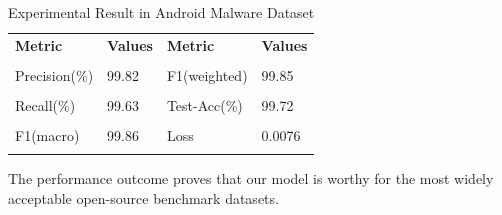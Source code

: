 \documentclass[pdflatex,sn-mathphys]{sn-jnl}%
\begin{document}
	\begin{table}[tb]
         \centering
		\caption{Experimental Result in Android Malware Dataset}
		\begin{tabular}{|p{2.6cm}||p{1.5cm}||p{2.6cm}||p{3.8cm}|}
			\midrule
			\textbf{Metric} & \textbf{Values} & \textbf{Metric} & \textbf{Values}\\\\
			  \midrule
			Precision(\%)   &  99.82 & F1(weighted)  & 99.85  \\\\
		
			Recall(\%) & 99.63 & Test-Acc(\%) & 99.72 \\\\
			
			F1(macro)  &  99.86 & Loss  & 0.0076 \\\\
			\hline
		\end{tabular}
	
		\label{student-malware}
  \vspace{-4mm}
	\end{table}

The performance outcome proves that our model is worthy for the most widely acceptable open-source benchmark datasets.
\end{document}
